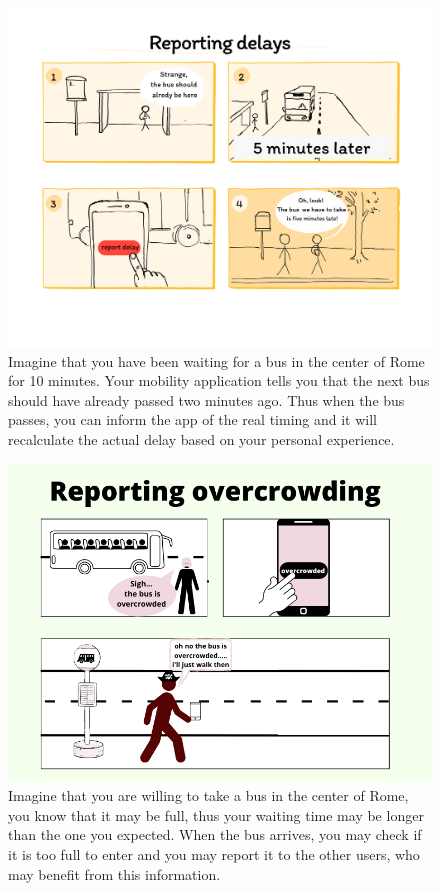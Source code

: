 \documentclass[a4paper, 11pt]{report}
\begin{document}
\begin{figure}[H]	 
	\centering
	\includegraphics [width=.5\textwidth]{img/storyboards/storyboard_reporting_delays.png}
	\caption{Imagine that you have been waiting
	for a bus in the center of Rome for 10 minutes. Your mobility application tells you
	 that the next bus should have already passed two minutes ago.
	  Thus when the bus passes, you can inform the app of the real timing and it will recalculate the actual
	   delay based on your personal experience.}
	\label{fig:b}
\end{figure}



\begin{figure}[H]
	\centering	 
	\includegraphics[width=.5\textwidth]{img/storyboards/storyboard_overcrowding.png}
	\caption{Imagine that you are willing to take a bus in the center of Rome,
	you know that it may be full, thus your waiting time may be longer than the one you expected. When the bus arrives,
	 you may check if it is too full to enter and you may report it to the other users, who may benefit from this information.}
	\label{fig:c}
\end{figure}
\end{document}

